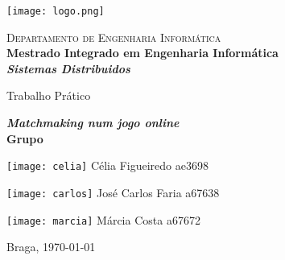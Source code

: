 \begin{titlepage}


\begin{minipage}{0.3\textwidth}
\begin{flushleft} 
\texttt{[image: logo.png]}
\end{flushleft}
\end{minipage}
\begin{minipage}{0.6\textwidth}
\begin{flushright} 

\textsc{Departamento de Engenharia Informática}\\[0.1cm]
\bfseries Mestrado Integrado em Engenharia Informática \\ [0.1cm]
\bfseries \textit{Sistemas Distribuidos}\\[8mm]

\end{flushright}
\end{minipage}


\vspace{3cm}


\begin{center}


\LARGE Trabalho Prático

\vspace{1cm}
\Large \textbf{\textit{Matchmaking num jogo online}}\\[1.5cm]


{\Large \bfseries Grupo \\[2cm] }


\noindent\begin{minipage}[b]{.2\textwidth}
	\texttt{[image: celia]}
	\small{Célia Figueiredo ae3698}
\end{minipage} 
\hfill
\begin{minipage}[b]{.2\textwidth}
	\texttt{[image: carlos]}
	\small{José Carlos Faria a67638}
\end{minipage}
\hfill
\begin{minipage}[b]{.2\textwidth}
	\texttt{[image: marcia]}
	\small{Márcia Costa a67672}
\end{minipage}




\vspace{3ex}


\vfill

\large Braga, {\large \today}

\end{center}
\end{titlepage}
